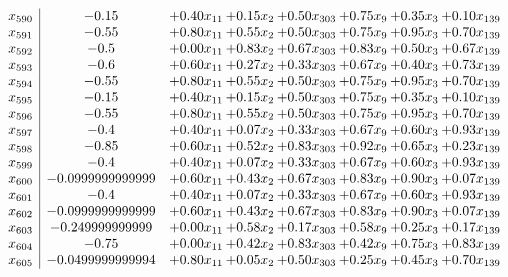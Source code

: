 \documentclass[8pt]{article}
\begin{document}
\[\begin{array}{c| c c@{\hskip 2pt} c@{\hskip 2pt} c@{\hskip 2pt} c@{\hskip 2pt} c@{\hskip 2pt} c@{\hskip 2pt} }
 x_{590}   &  -0.15 & +  0.40 x_{11} & +  0.15 x_{2} & +  0.50 x_{303} & +  0.75 x_{9} & +  0.35 x_{3} & +  0.10 x_{139}\\
 x_{591}   &  -0.55 & +  0.80 x_{11} & +  0.55 x_{2} & +  0.50 x_{303} & +  0.75 x_{9} & +  0.95 x_{3} & +  0.70 x_{139}\\
 x_{592}   &  -0.5 & +  0.00 x_{11} & +  0.83 x_{2} & +  0.67 x_{303} & +  0.83 x_{9} & +  0.50 x_{3} & +  0.67 x_{139}\\
 x_{593}   &  -0.6 & +  0.60 x_{11} & +  0.27 x_{2} & +  0.33 x_{303} & +  0.67 x_{9} & +  0.40 x_{3} & +  0.73 x_{139}\\
 x_{594}   &  -0.55 & +  0.80 x_{11} & +  0.55 x_{2} & +  0.50 x_{303} & +  0.75 x_{9} & +  0.95 x_{3} & +  0.70 x_{139}\\
 x_{595}   &  -0.15 & +  0.40 x_{11} & +  0.15 x_{2} & +  0.50 x_{303} & +  0.75 x_{9} & +  0.35 x_{3} & +  0.10 x_{139}\\
 x_{596}   &  -0.55 & +  0.80 x_{11} & +  0.55 x_{2} & +  0.50 x_{303} & +  0.75 x_{9} & +  0.95 x_{3} & +  0.70 x_{139}\\
 x_{597}   &  -0.4 & +  0.40 x_{11} & +  0.07 x_{2} & +  0.33 x_{303} & +  0.67 x_{9} & +  0.60 x_{3} & +  0.93 x_{139}\\
 x_{598}   &  -0.85 & +  0.60 x_{11} & +  0.52 x_{2} & +  0.83 x_{303} & +  0.92 x_{9} & +  0.65 x_{3} & +  0.23 x_{139}\\
 x_{599}   &  -0.4 & +  0.40 x_{11} & +  0.07 x_{2} & +  0.33 x_{303} & +  0.67 x_{9} & +  0.60 x_{3} & +  0.93 x_{139}\\
 x_{600}   &  -0.0999999999999 & +  0.60 x_{11} & +  0.43 x_{2} & +  0.67 x_{303} & +  0.83 x_{9} & +  0.90 x_{3} & +  0.07 x_{139}\\
 x_{601}   &  -0.4 & +  0.40 x_{11} & +  0.07 x_{2} & +  0.33 x_{303} & +  0.67 x_{9} & +  0.60 x_{3} & +  0.93 x_{139}\\
 x_{602}   &  -0.0999999999999 & +  0.60 x_{11} & +  0.43 x_{2} & +  0.67 x_{303} & +  0.83 x_{9} & +  0.90 x_{3} & +  0.07 x_{139}\\
 x_{603}   &  -0.249999999999 & +  0.00 x_{11} & +  0.58 x_{2} & +  0.17 x_{303} & +  0.58 x_{9} & +  0.25 x_{3} & +  0.17 x_{139}\\
 x_{604}   &  -0.75 & +  0.00 x_{11} & +  0.42 x_{2} & +  0.83 x_{303} & +  0.42 x_{9} & +  0.75 x_{3} & +  0.83 x_{139}\\
 x_{605}   &  -0.0499999999994 & +  0.80 x_{11} & +  0.05 x_{2} & +  0.50 x_{303} & +  0.25 x_{9} & +  0.45 x_{3} & +  0.70 x_{139}\\

\end{array}\]
\end{document}
